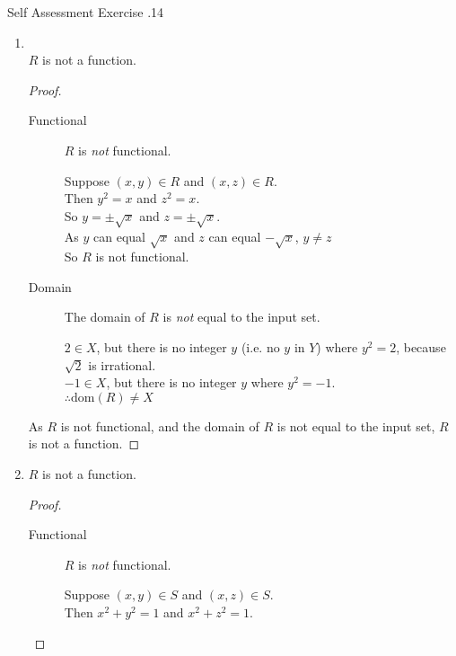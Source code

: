 \documentclass[\main/notes.tex]{subfiles}
\begin{document}
\begin{exercise}{Self Assessment Exercise \thechapter.14}
\begin{enumerate}
\begin{enumerate}[label=(\alph*)]
\begin{proof}
									\end{proof}
								\item {}\\
									$R$ is not a function.
									\begin{proof}
										$ $
										\begin{description}
											\item[Functional] $R$ is \emph{not} functional.
												\begin{subproof}[Subproof]
													Suppose $(x, y) \in R$ and $(x, z) \in R$.\\
													Then $y^{2} = x$ and $z^{2} = x$.\\
													So $y = \pm \sqrt{x}$ and $z = \pm \sqrt{x}$.\\
													As $y$ can equal $\sqrt{x}$ and $z$ can equal $- \sqrt{x}$, $y \neq z$\\
													So $R$ is not functional.
												\end{subproof}
											\item[Domain] The domain of $R$ is \emph{not} equal to the input set.
												\begin{subproof}[Counterexample]
													$2 \in X$, but there is no integer $y$ (i.e. no $y$ in $Y$) where $y^{2} = 2$, because $\sqrt{2}$ is irrational.\\
													$-1 \in X$, but there is no integer $y$ where $y^{2} = -1$.\\
													$\therefore \mathrm{dom}(R) \neq X$ 
												\end{subproof}
										\end{description}
										As $R$ is not functional, and the domain of $R$ is not equal to the input set, $R$ is not a function.
									\end{proof}
								\pagebreak
								\item {}
									$R$ is not a function.
									\begin{proof}
										$ $
										\begin{description}
											\item[Functional] $R$ is \emph{not} functional.
												\begin{subproof}[Subproof]
													Suppose $(x, y) \in S$ and $(x, z) \in S$.\\
													Then $x^{2} + y^{2} = 1$ and $x^{2} + z^{2} = 1$.\\

\end{subproof}
\end{description}
\end{proof}
\end{enumerate}
\end{enumerate}
\end{exercise}
\end{document}
